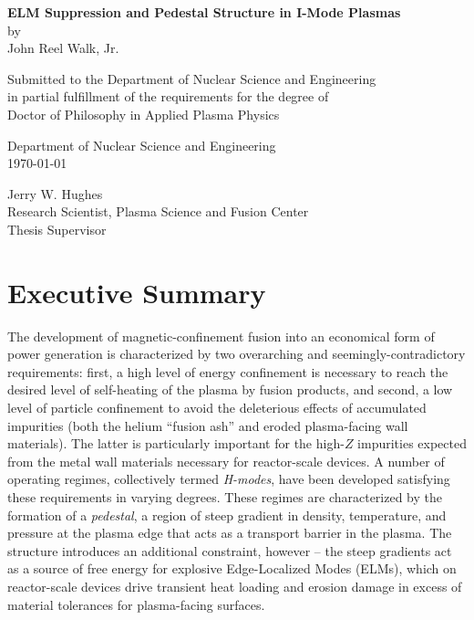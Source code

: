 \documentclass[ twoside,openright,titlepage,numbers=noenddot,headinclude,%
                footinclude=true,cleardoublepage=empty,abstractoff, %
                BCOR=5mm,paper=letter,fontsize=11pt,%
                ngerman,american,%
                ]{scrreprt}
\begin{document}
\frenchspacing
\raggedbottom
{}
\pagestyle{plain}

\let\cleardoublepage\relax
\begin{center}{\large{\bf ELM Suppression and Pedestal Structure in I-Mode Plasmas} \\
by \\
John Reel Walk, Jr. \\[\baselineskip]}
\par
Submitted to the Department of Nuclear Science and Engineering \\
in partial fulfillment of the requirements for the degree of \\
Doctor of Philosophy in Applied Plasma Physics
\end{center}
\par
{}\baselineskip
\signature{Author}{Department of Nuclear Science and Engineering \\ \today}
\par
{}\baselineskip
\signature{Certified by}{Jerry W. Hughes \\ Research Scientist, Plasma Science and Fusion Center \\ Thesis Supervisor}
\par
{}\baselineskip

\chapter*{Executive Summary}

The development of magnetic-confinement fusion into an economical form of power generation is characterized by two overarching and seemingly-contradictory requirements: first, a high level of energy confinement is necessary to reach the desired level of self-heating of the plasma by fusion products, and second, a low level of particle confinement to avoid the deleterious effects of accumulated impurities (both the helium ``fusion ash'' and eroded plasma-facing wall materials).  The latter is particularly important for the high-$Z$ impurities expected from the metal wall materials necessary for reactor-scale devices.  A number of operating regimes, collectively termed \emph{H-modes}, have been developed satisfying these requirements in varying degrees.  These regimes are characterized by the formation of a \emph{pedestal}, a region of steep gradient in density, temperature, and pressure at the plasma edge that acts as a transport barrier in the plasma.  The structure introduces an additional constraint, however -- the steep gradients act as a source of free energy for explosive Edge-Localized Modes (ELMs), which on reactor-scale devices drive transient heat loading and erosion damage in excess of material tolerances for plasma-facing surfaces.
\end{document}
